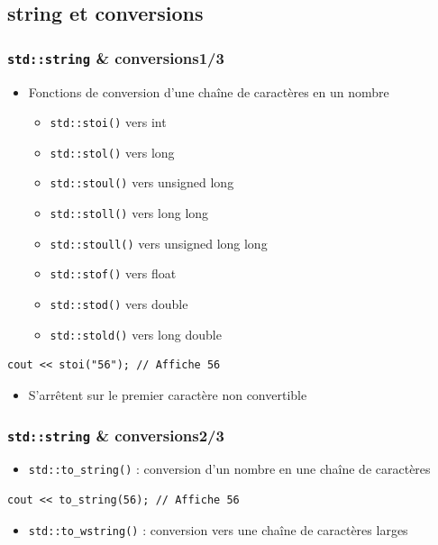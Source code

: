 \documentclass[C++.tex]{subfiles}
\begin{document}
\subsection*{string et conversions}
\begin{frame}[fragile]
	\frametitle{\lstinline|std::string| \& conversions\titlehfill{}1/3}
	\begin{itemize}
		\item Fonctions de conversion d'une chaîne de caractères en un nombre
		\begin{itemize}
			\item \lstinline|std::stoi()| vers int
			\item \lstinline|std::stol()| vers long
			\item \lstinline|std::stoul()| vers unsigned long
			\item \lstinline|std::stoll()| vers long long
			\item \lstinline|std::stoull()| vers unsigned long long
			\item \lstinline|std::stof()| vers float
			\item \lstinline|std::stod()| vers double
			\item \lstinline|std::stold()| vers long double
		\end{itemize}
	\end{itemize}

	\begin{lstlisting}
cout << stoi("56"); // Affiche 56\end{lstlisting}

	\begin{itemize}
		\item S'arrêtent sur le premier caractère non convertible
	\end{itemize}
\end{frame}

\begin{frame}[fragile]
	\frametitle{\lstinline|std::string| \& conversions\titlehfill{}2/3}
	\begin{itemize}
		\item \lstinline|std::to_string()| : conversion d'un nombre en une chaîne de caractères
	\end{itemize}

	\begin{lstlisting}
cout << to_string(56); // Affiche 56\end{lstlisting}

	\begin{itemize}
		\item \lstinline|std::to_wstring()| : conversion vers une chaîne de caractères larges
	\end{itemize}
\end{frame}
\end{document}
